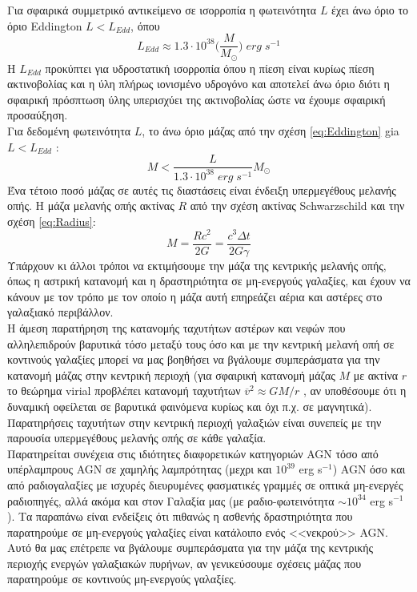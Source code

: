 Για σφαιρικά συμμετρικό αντικείμενο σε ισορροπία η φωτεινότητα $L$ έχει άνω όριο το όριο \textlatin{Eddington} $ L < L_{Edd}$, όπου 
\begin{equation} L_{Edd} \approx 1.3 \cdot 10^{38} \big( \frac{M}{M_{\odot}} \big) \; erg \; s^{-1} \label{eq:Eddington}\end{equation}
Η $ L_{Edd}$ προκύπτει για υδροστατική ισορροπία όπου η πίεση είναι κυρίως πίεση ακτινοβολίας και η ύλη πλήρως ιονισμένο υδρογόνο και αποτελεί άνω όριο διότι η σφαιρική πρόσπτωση ύλης υπερισχύει της ακτινοβολίας ώστε να έχουμε σφαιρική προσαύξηση.\\
Για δεδομένη φωτεινότητα $L$, το άνω όριο μάζας από την σχέση \ref{eq:Eddington} gia $ L < L_{Edd}$ \cite{carroll_ostlie_2017}:
\begin{equation} M< \dfrac {L}{1.3\cdot 10^{38} \; erg \; s^{-1}} M_{\odot} \end{equation}
Ένα τέτοιο ποσό μάζας σε αυτές τις διαστάσεις είναι ένδειξη υπερμεγέθους μελανής οπής.
Η μάζα μελανής οπής ακτίνας $R$ από την σχέση ακτίνας \textlatin{Schwarzschild} και την σχέση \ref{eq:Radius}:
\begin{equation} M = \dfrac{Rc^2}{2G} =\dfrac {c^3\Delta t}{2G \gamma }  \end{equation}
Υπάρχουν κι άλλοι τρόποι να εκτιμήσουμε την μάζα της κεντρικής μελανής οπής, όπως η αστρική κατανομή και η δραστηριότητα σε μη-ενεργούς γαλαξίες, και έχουν να κάνουν με τον τρόπο με τον οποίο η μάζα αυτή επηρεάζει αέρια και αστέρες στο γαλαξιακό περιβάλλον\cite{AccrPower}.\\
Η άμεση παρατήρηση της κατανομής ταχυτήτων αστέρων και νεφών που αλληλεπιδρούν βαρυτικά τόσο μεταξύ τους όσο και με την κεντρική μελανή οπή σε κοντινούς γαλαξίες μπορεί να μας βοηθήσει να βγάλουμε συμπεράσματα για την κατανομή μάζας στην κεντρική περιοχή (για σφαιρική κατανομή μάζας $Μ$ με ακτίνα $r$ το θεώρημα \textlatin{virial} προβλέπει κατανομή ταχυτήτων $\overline{v}^2 \approx G M /r$ , αν υποθέσουμε ότι η δυναμική οφείλεται σε βαρυτικά φαινόμενα κυρίως και όχι π.χ. σε μαγνητικά). Παρατηρήσεις ταχυτήτων στην κεντρική περιοχή γαλαξιών είναι συνεπείς με την παρουσία υπερμεγέθους μελανής οπής σε κάθε γαλαξία.\\
Παρατηρείται συνέχεια στις ιδιότητες διαφορετικών κατηγοριών \textlatin{AGN} τόσο από υπέρλαμπρους \textlatin{AGN} σε χαμηλής λαμπρότητας (μεχρι και $10^{39}$ \textlatin{erg s}$^{-1}$) \textlatin{AGN} όσο και από ραδιογαλαξίες με ισχυρές διευρυμένες φασματικές γραμμές σε οπτικά μη-ενεργές ραδιοπηγές, αλλά ακόμα και στον Γαλαξία μας (με ραδιο-φωτεινότητα $\sim 10^{34}$ \textlatin{erg s}$^{-1}$). Τα παραπάνω είναι ενδείξεις ότι πιθανώς η ασθενής δραστηριότητα που παρατηρούμε σε μη-ενεργούς γαλαξίες είναι κατάλοιπο ενός <<νεκρού>> \textlatin{AGN}. Αυτό θα μας επέτρεπε να βγάλουμε συμπεράσματα για την μάζα της κεντρικής περιοχής ενεργών γαλαξιακών πυρήνων, αν γενικεύσουμε σχέσεις μάζας που παρατηρούμε σε κοντινούς μη-ενεργούς γαλαξίες.

